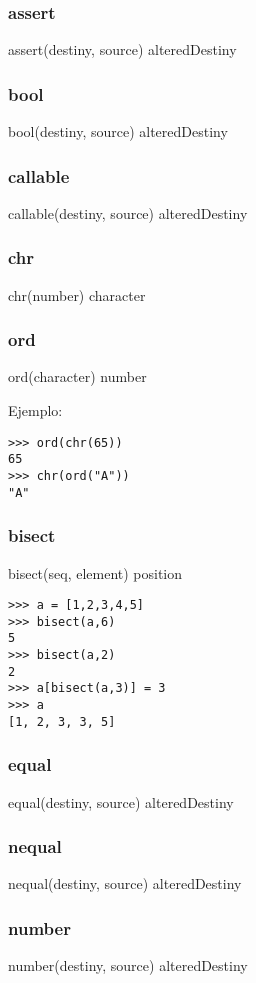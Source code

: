 \subsubsection*{assert}
assert(destiny, source) \rightarrow alteredDestiny
\subsubsection*{bool}
bool(destiny, source) \rightarrow alteredDestiny
\subsubsection*{callable}
callable(destiny, source) \rightarrow alteredDestiny
\subsubsection*{chr}
chr(number) \rightarrow character
\subsubsection*{ord}
ord(character) \rightarrow number

\noindent
Ejemplo:
\begin{lstlisting}[style=consola]
>>> ord(chr(65))
65
>>> chr(ord("A"))
"A"
\end{lstlisting}

\subsubsection*{bisect}
bisect(seq, element) \rightarrow position

\begin{lstlisting}[style=consola]
>>> a = [1,2,3,4,5]
>>> bisect(a,6)
5
>>> bisect(a,2)
2
>>> a[bisect(a,3)] = 3
>>> a
[1, 2, 3, 3, 5]
\end{lstlisting}

\subsubsection*{equal}
equal(destiny, source) \rightarrow alteredDestiny
\subsubsection*{nequal}
nequal(destiny, source) \rightarrow alteredDestiny
\subsubsection*{number}
number(destiny, source) \rightarrow alteredDestiny
